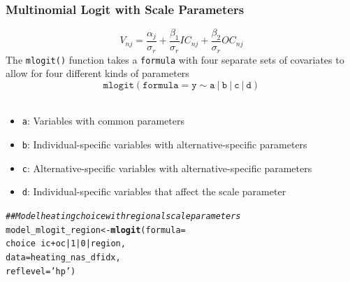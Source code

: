 \documentclass{beamer}\usepackage[]{graphicx}\usepackage[]{color}
\makeatletter
\newcommand{\hlnum}[1]{\textcolor[rgb]{0.686,0.059,0.569}{#1}}%
\newcommand{\hlstr}[1]{\textcolor[rgb]{0.192,0.494,0.8}{#1}}%
\newcommand{\hlcom}[1]{\textcolor[rgb]{0.678,0.584,0.686}{\textit{#1}}}%
\newcommand{\hlopt}[1]{\textcolor[rgb]{0,0,0}{#1}}%
\newcommand{\hlstd}[1]{\textcolor[rgb]{0.345,0.345,0.345}{#1}}%
\newcommand{\hlkwb}[1]{\textcolor[rgb]{0.69,0.353,0.396}{#1}}%
\newcommand{\hlkwc}[1]{\textcolor[rgb]{0.333,0.667,0.333}{#1}}%
\newcommand{\hlkwd}[1]{\textcolor[rgb]{0.737,0.353,0.396}{\textbf{#1}}}%
\newenvironment{kframe}{%
 \def\at@end@of@kframe{}%
 \ifinner\ifhmode%
  \def\at@end@of@kframe{\end{minipage}}%
  \begin{minipage}{\columnwidth}%
 \fi\fi%
 \def\FrameCommand##1{\hskip\@totalleftmargin \hskip-\fboxsep
 \colorbox{shadecolor}{##1}\hskip-\fboxsep
     \hskip-\linewidth \hskip-\@totalleftmargin \hskip\columnwidth}%
 \MakeFramed {\advance\hsize-\width
   \@totalleftmargin\z@ \linewidth\hsize
   \@setminipage}}%
 {\par\unskip\endMakeFramed%
 \at@end@of@kframe}
\newenvironment{knitrout}{}{} %
\makeatother
\begin{document}
\begin{frame}[fragile]\frametitle{Multinomial Logit with Scale Parameters}
    \vspace{-1ex}
    $$V_{nj} = \frac{\alpha_j}{\sigma_r} + \frac{\beta_1}{\sigma_r} IC_{nj} + \frac{\beta_2}{\sigma_r} OC_{nj}$$
    The \texttt{mlogit()} function takes a \texttt{formula} with four separate sets of covariates to allow for four different kinds of parameters
    $$\mathtt{mlogit(formula = y \sim a ~|~ b ~|~ c ~|~ d)}$$ \\
    \begin{itemize}
    	\item \texttt{a}: Variables with common parameters
    	\item \texttt{b}: Individual-specific variables with alternative-specific parameters
    	\item \texttt{c}: Alternative-specific variables with alternative-specific parameters
    	\item \texttt{d}: Individual-specific variables that affect the scale parameter
    \end{itemize}
\begin{knitrout}\footnotesize
{}\color{fgcolor}\begin{kframe}
\begin{alltt}
\hlcom{## Model heating choice with regional scale parameters}
\hlstd{model_mlogit_region} \hlkwb{<-} \hlkwd{mlogit}\hlstd{(}\hlkwc{formula} \hlstd{=}
                                \hlstd{choice} \hlopt{~} \hlstd{ic} \hlopt{+} \hlstd{oc} \hlopt{|} \hlnum{1} \hlopt{|} \hlnum{0} \hlopt{|} \hlstd{region,}
                              \hlkwc{data} \hlstd{= heating_nas_dfidx,}
                              \hlkwc{reflevel} \hlstd{=} \hlstr{'hp'}\hlstd{)}
\end{alltt}
\end{kframe}
\end{knitrout}
\end{frame}
\end{document}
